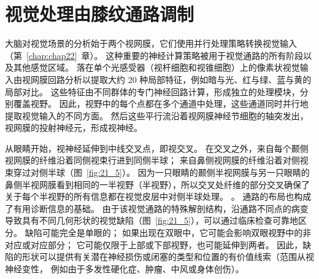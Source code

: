 \section{视觉处理由膝纹通路调制}

大脑对视觉场景的分析始于两个视网膜，它们使用并行处理策略转换视觉输入（第~\ref{chap:chap22}~章）。
这种重要的神经计算策略被用于视觉通路的所有阶段以及其他感觉区域。
落在单个光感受器（视杆细胞和视锥细胞）上的像素状视觉输入由视网膜回路分析以提取大约 20 种局部特征，例如暗与光、红与绿、蓝与黄的局部对比。
这些特征由不同群体的专门神经回路计算，形成独立的处理模块，分别覆盖视野。
因此，视野中的每个点都在多个通道中处理，这些通道同时并行地提取视觉输入的不同方面。
然后这些平行流沿着视网膜神经节细胞的轴突发出，视网膜的投射神经元，形成视神经。


从眼睛开始，视神经延伸到中线交叉点，即视交叉。
在交叉之外，来自每个颞侧视网膜的纤维沿着同侧视束行进到同侧半球；
来自鼻侧视网膜的纤维沿着对侧视束穿过对侧半球（图~\ref{fig:21_5}）。
因为一只眼睛的颞侧半视网膜与另一只眼睛的鼻侧半视网膜看到相同的一半视野（半视野），所以交叉处纤维的部分交叉确保了关于每个半视野的所有信息都在视觉皮层中对侧半球处理。 。
通路的布局也构成了有用诊断信息的基础。
由于该视觉通路的特殊解剖结构，沿通路不同点的病变导致具有不同几何形状的视觉缺陷（图~\ref{fig:21_5}），可以通过临床检查可靠地区分。
缺陷可能完全是单眼的；
如果出现在双眼中，它可能会影响双眼视野中的非对应或对应部分；
它可能仅限于上部或下部视野，也可能延伸到两者。
因此，缺陷的形状可以提供有关潜在神经损伤或闭塞的类型和位置的有价值线索（范围从视神经变性， 例如由于多发性硬化症、肿瘤、中风或身体创伤）。


